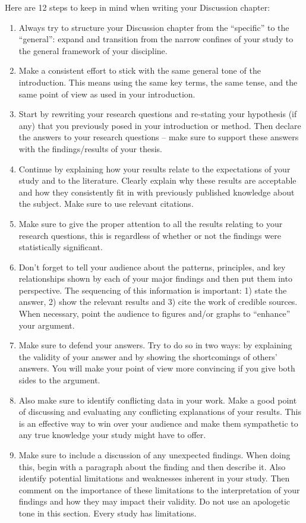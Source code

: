 \documentclass[a4paper,twoside]{bth}
\begin{document}
Here are 12 steps to keep in mind when writing your Discussion chapter:
\begin{enumerate}
    \item Always try to structure your Discussion chapter from the ``specific'' to the ``general'': expand and transition from the narrow confines of your study to the general framework of your discipline.
    \item Make a consistent effort to stick with the same general tone of the introduction. This means using the same key terms, the same tense, and the same point of view as used in your introduction.
    \item Start by rewriting your research questions and re-stating your hypothesis (if any) that you previously posed in your introduction or method. Then declare the answers to your research questions -- make sure to support these answers with the findings/results of your thesis.
    \item Continue by explaining how your results relate to the expectations of your study and to the literature. Clearly explain why these results are acceptable and how they consistently fit in with previously published knowledge about the subject. Make sure to use relevant citations.
    \item Make sure to give the proper attention to all the results relating to your research questions, this is regardless of whether or not the findings were statistically significant.
    \item Don't forget to tell your audience about the patterns, principles, and key relationships shown by each of your major findings and then put them into perspective. The sequencing of this information is important: 1) state the answer, 2) show the relevant results and 3) cite the work of credible sources. When necessary, point the audience to figures and/or graphs to ``enhance'' your argument.
    \item Make sure to defend your answers. Try to do so in two ways: by explaining the validity of your answer and by showing the shortcomings of others' answers. You will make your point of view more convincing if you give both sides to the argument.
    \item Also make sure to identify conflicting data in your work. Make a good point of discussing and evaluating any conflicting explanations of your results. This is an effective way to win over your audience and make them sympathetic to any true knowledge your study might have to offer.
    \item Make sure to include a discussion of any unexpected findings. When doing this, begin with a paragraph about the finding and then describe it. Also identify potential limitations and weaknesses inherent in your study. Then comment on the importance of these limitations to the interpretation of your findings and how they may impact their validity. Do not use an apologetic tone in this section. Every study has limitations.

\end{enumerate}
\end{document}
